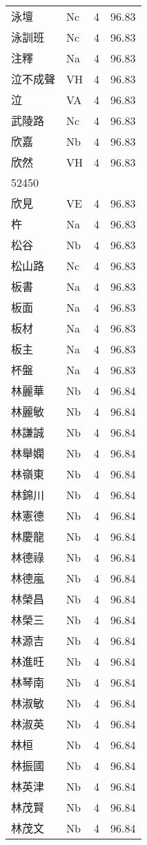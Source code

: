 \documentclass[twocolumn]{book}
\begin{document}
\begin{supertabular}{llrr}
泳壇 & Nc & 4 &  96.83\\
泳訓班 & Nc & 4 &  96.83\\
注釋 & Na & 4 &  96.83\\
泣不成聲 & VH & 4 &  96.83\\
泣 & VA & 4 &  96.83\\
武陵路 & Nc & 4 &  96.83\\
欣嘉 & Nb & 4 &  96.83\\
欣然 & VH & 4 &  96.83\\
52450\\
欣見 & VE & 4 &  96.83\\
杵 & Na & 4 &  96.83\\
松谷 & Nb & 4 &  96.83\\
松山路 & Nc & 4 &  96.83\\
板書 & Na & 4 &  96.83\\
板面 & Na & 4 &  96.83\\
板材 & Na & 4 &  96.83\\
板主 & Na & 4 &  96.83\\
杯盤 & Na & 4 &  96.83\\
林麗華 & Nb & 4 &  96.84\\
林麗敏 & Nb & 4 &  96.84\\
林謙誠 & Nb & 4 &  96.84\\
林舉嫻 & Nb & 4 &  96.84\\
林嶺東 & Nb & 4 &  96.84\\
林錦川 & Nb & 4 &  96.84\\
林憲德 & Nb & 4 &  96.84\\
林慶龍 & Nb & 4 &  96.84\\
林德祿 & Nb & 4 &  96.84\\
林德嵐 & Nb & 4 &  96.84\\
林榮昌 & Nb & 4 &  96.84\\
林榮三 & Nb & 4 &  96.84\\
林源吉 & Nb & 4 &  96.84\\
林進旺 & Nb & 4 &  96.84\\
林琴南 & Nb & 4 &  96.84\\
林淑敏 & Nb & 4 &  96.84\\
林淑英 & Nb & 4 &  96.84\\
林桓 & Nb & 4 &  96.84\\
林振國 & Nb & 4 &  96.84\\
林英津 & Nb & 4 &  96.84\\
林茂賢 & Nb & 4 &  96.84\\
林茂文 & Nb & 4 &  96.84\\

\end{supertabular}
\end{document}
